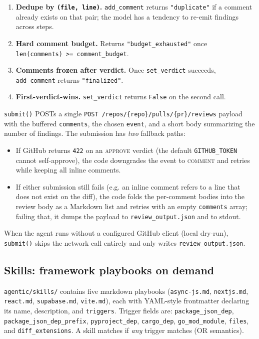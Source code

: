 \documentclass[11pt,a4paper]{article}
\newcommand{\code}[1]{\texttt{\small #1}}
\begin{document}
\begin{enumerate}[leftmargin=*]
  \item \textbf{Dedupe by \code{(file, line)}.} \code{add\_comment} returns
        \code{"duplicate"} if a comment already exists on that pair; the
        model has a tendency to re-emit findings across steps.
  \item \textbf{Hard comment budget.} Returns \code{"budget\_exhausted"}
        once \code{len(comments) >= comment\_budget}.
  \item \textbf{Comments frozen after verdict.} Once
        \code{set\_verdict} succeeds, \code{add\_comment} returns
        \code{"finalized"}.
  \item \textbf{First-verdict-wins.} \code{set\_verdict} returns
        \code{False} on the second call.
\end{enumerate}

\code{submit()} POSTs a single
\code{POST /repos/\{repo\}/pulls/\{pr\}/reviews} payload with the buffered
\code{comments}, the chosen \code{event}, and a short body summarizing the
number of findings. The submission has \emph{two} fallback paths:

\begin{itemize}[leftmargin=*]
  \item If GitHub returns \code{422} on an \textsc{approve} verdict (the
        default \code{GITHUB\_TOKEN} cannot self-approve), the code
        downgrades the event to \textsc{comment} and retries while keeping
        all inline comments.
  \item If either submission still fails (e.g. an inline comment refers to
        a line that does not exist on the diff), the code folds the
        per-comment bodies into the review body as a Markdown list and
        retries with an empty \code{comments} array; failing that, it
        dumps the payload to \code{review\_output.json} and to stdout.
\end{itemize}

When the agent runs without a configured GitHub client (local dry-run),
\code{submit()} skips the network call entirely and only writes
\code{review\_output.json}.

\subsection{Skills: framework playbooks on demand}
\label{sec:skills}

\code{agentic/skills/} contains five markdown playbooks
(\code{async-js.md}, \code{nextjs.md}, \code{react.md}, \code{supabase.md},
\code{vite.md}), each with YAML-style frontmatter declaring its name,
description, and \code{triggers}. Trigger fields are:
\code{package\_json\_dep}, \code{package\_json\_dep\_prefix},
\code{pyproject\_dep}, \code{cargo\_dep}, \code{go\_mod\_module},
\code{files}, and \code{diff\_extensions}. A skill matches if \emph{any}
trigger matches (OR semantics).
\end{document}
